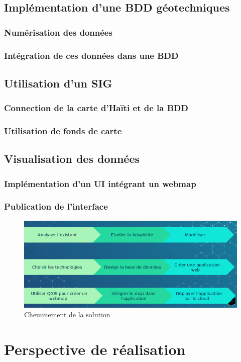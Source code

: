         \subsection{Implémentation d'une BDD géotechniques}
            \subsubsection{Numérisation des données}
                
            \subsubsection{Intégration de ces données dans une BDD}
                
        \subsection{Utilisation d'un SIG}
            \subsubsection{Connection de la carte d'Haïti et de la BDD}
                
            \subsubsection{Utilisation de fonds de carte}
                
        \subsection{Visualisation des données} 
            \subsubsection{Implémentation d'un UI intégrant un webmap}
                
            \subsubsection{Publication de l'interface}
                
        \begin{figure}[t]
            \centering
            \includegraphics[width=1\textwidth]{images/Contexte/evolution_projetGIS.png}
            \caption{Cheminement de la solution}
        \end{figure}

    \section{Perspective de réalisation}
         